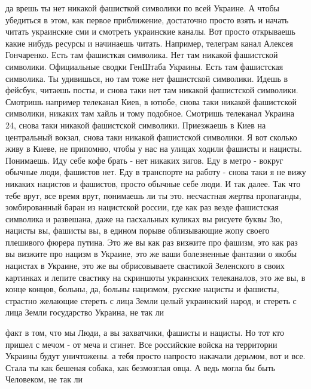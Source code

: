 да врешь ты нет никакой фашисткой символики по всей Украине. А чтобы убедиться
в этом, как первое приближение, достаточно просто взять и начать читать
украинские сми и смотреть украинские каналы. Вот просто открываешь какие нибудь
ресурсы и начинаешь читать. Например, телеграм канал Алексея Гончаренко. Есть
там фашисткая символика. Нет там никакой фашистской символики. Официальные
сводки ГенШтаба Украины. Есть там фашистская символика. Ты удивишься, но там
тоже нет фашистской символики. Идешь в фейсбук, читаешь посты, и снова таки нет
там никакой фашистской символики. Смотришь например телеканал Киев, в ютюбе,
снова таки никакой фашистской символики, никаких там хайль и тому подобное.
Смотришь телеканал Украина 24, снова таки никакой фашистской символики.
Приезжаешь в Киев на центральный вокзал, снова таки никакой фашистской
символики. Я вот сколько живу в Киеве, не припомню, чтобы у нас на улицах
ходили фашисты и нацисты. Понимаешь.  Иду себе кофе брать - нет никаких зигов.
Еду в метро - вокруг обычные люди, фашистов нет.  Еду в транспорте на работу -
снова таки я не вижу никаких нацистов и фашистов, просто обычные себе люди.  И
так далее. Так что тебе врут, все время врут, понимаешь ли ты это.  несчастная
жертва пропаганды, зомбированный баран из нацистской россии, где как раз везде
фашистская символика и развешана, даже на пасхальных куликах вы рисуете буквы
Зю, нацисты вы, фашисты вы, в едином порыве облизывающие жопу своего плешивого
фюрера путина. Это же вы как раз визжите про фашизм, это как раз вы визжите про
нацизм в Украине, это же ваши болезненные фантазии о якобы нацистах в Украине,
это же вы обрисовываете свастикой Зеленского в своих картинках и лепите
свастику на скриншоты украинских телеканалов, это же вы, в конце концов,
больны, да, больны нацизмом, русские нацисты и фашисты, страстно желающие
стереть с лица Земли целый украинский народ, и стереть с лица Земли государство
Украина, не так ли

факт в том, что мы Люди, а вы захватчики, фашисты и нацисты. Но тот кто пришел
с мечом - от меча и сгинет. Все российские войска на территории Украины будут
уничтожены.  
а тебя просто напросто накачали дерьмом, вот и все. Стала ты как бешеная
собака, как безмозглая овца. А ведь могла бы быть Человеком, не так ли 

